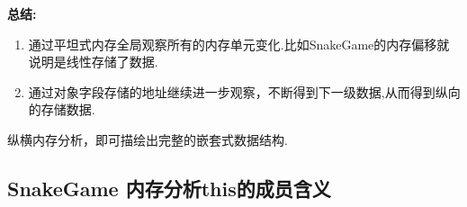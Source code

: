 \documentclass[AutoFakeBold,AutoFakeSlant]{beamer}
\begin{document}
\begin{frame}[fragile]
    \normalsize
    \textbf{总结:} \\
    \begin{enumerate}
        \item 通过平坦式内存全局观察所有的内存单元变化.比如SnakeGame的内存偏移就说明是线性存储了数据.
        \item 通过对象字段存储的地址继续进一步观察，不断得到下一级数据,从而得到纵向的存储数据.
    \end{enumerate}
    纵横内存分析，即可描绘出完整的嵌套式数据结构.
    \linespread{1} \selectfont
\end{frame}


\subsection{SnakeGame 内存分析this的成员含义}
\end{document}
